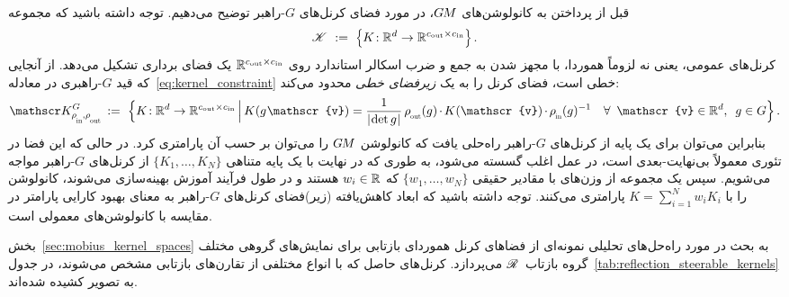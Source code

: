 قبل از پرداختن به کانولوشن‌های $G\mkern-1.4muM$، در مورد فضای کرنل‌های $G$-راهبر توضیح می‌دهیم.
توجه داشته باشید که مجموعه
\begin{align}\label{eq:unconstrained_kernel_space}
	\mathscr{K}\ :=\ \pig\{ K\!: \R^d \to \R^{\cout\times\cin} \pig\} \,.
\end{align}
کرنل‌های عمومی، یعنی نه لزوماً هموردا، با مجهز شدن به جمع و ضرب اسکالر استاندارد روی $\mathbb{R}^{{c_\textup{out}}\times{c_\textup{in}}}$ یک فضای برداری تشکیل می‌دهد.
از آنجایی که قید $G$-راهبری در معادله~\eqref{eq:kernel_constraint} خطی است، فضای کرنل را به یک \emph{زیرفضای خطی} محدود می‌کند:
\begin{align}\label{eq:G-steerable_kernel_space}
	\KG\, :=\ \Big\{ K\!: \R^d \to \R^{\cout\times\cin} \,\Big|\,
	K(g\mkern1mu \mathscr{v}) = \frac{1}{\detg}\, \rhoout(g) \mkern-1.5mu\cdot\mkern-1.5mu K(\mathscr{v}) \mkern-1.5mu\cdot\mkern-1.5mu \rhoin(g)^{-1} \ \ \ \forall\,\ \mathscr{v}\in \R^d,\,\ g\in G \Big\} \,.
\end{align}
بنابراین می‌توان برای یک پایه از کرنل‌های $G$-راهبر راه‌حلی یافت که کانولوشن $G\mkern-1.4muM$ را می‌توان بر حسب آن پارامتری کرد.
در حالی که این فضا در تئوری معمولاً بی‌نهایت-بعدی است، در عمل اغلب گسسته می‌شود، به طوری که در نهایت با یک پایه متناهی $\{K_1,\dots,K_N\}$ از کرنل‌های $G$-راهبر مواجه می‌شویم.
سپس یک مجموعه از وزن‌های با مقادیر حقیقی $\{w_1,\dots,w_N\}$ که $w_i\in\mathbb{R}$ هستند و در طول فرآیند آموزش بهینه‌سازی می‌شوند، کانولوشن را با $K = \sum_{i=1}^N w_i K_i$ پارامتری می‌کنند.
توجه داشته باشید که ابعاد کاهش‌یافته (زیر)فضای کرنل‌های $G$-راهبر به معنای بهبود کارایی پارامتر در مقایسه با کانولوشن‌های معمولی است.


بخش~\ref{sec:mobius_kernel_spaces} به بحث در مورد راه‌حل‌های تحلیلی نمونه‌ای از فضاهای کرنل هموردای بازتابی برای نمایش‌های گروهی مختلف گروه بازتاب~$\mathscr{R}$ می‌پردازد.
کرنل‌های حاصل که با انواع مختلفی از تقارن‌های بازتابی مشخص می‌شوند، در جدول~\ref{tab:reflection_steerable_kernels} به تصویر کشیده شده‌اند.


